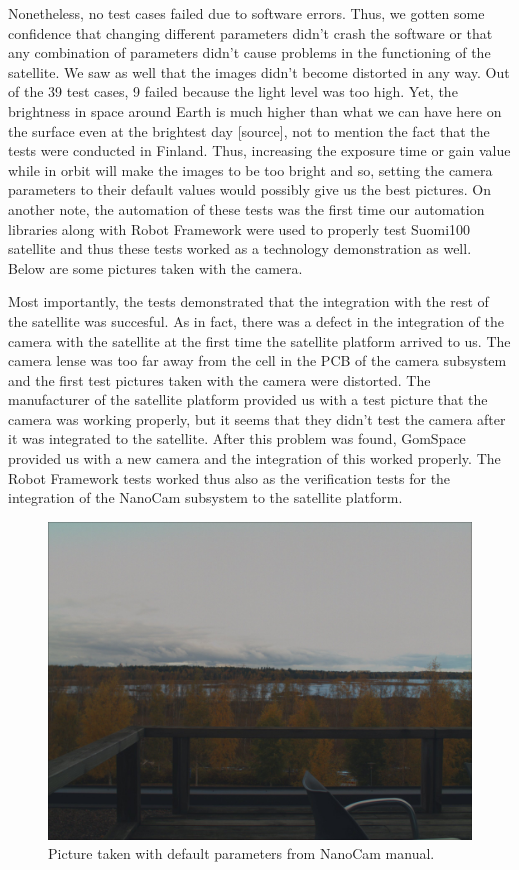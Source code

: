 \documentclass[english,12pt,a4paper,pdftex,elec,utf8]{aaltothesis}
\begin{document}
Nonetheless, no test cases failed due to software errors. Thus, we gotten some confidence that changing different parameters didn't crash the software or that any combination of parameters didn't cause problems in the functioning of the satellite. We saw as well that the images didn't become distorted in any way. Out of the 39 test cases, 9 failed because the light level was too high. Yet, the brightness in space around Earth is much higher than what we can have here on the surface even at the brightest day [source], not to mention the fact that the tests were conducted in Finland. Thus, increasing the exposure time or gain value while in orbit will make the images to be too bright and so, setting the camera parameters to their default values would possibly give us the best pictures. On another note, the automation of these tests was the first time our automation libraries along with Robot Framework were used to properly test Suomi100 satellite and thus these tests worked as a technology demonstration as well. Below are some pictures taken with the camera.\par
Most importantly, the tests demonstrated that the integration with the rest of the satellite was succesful. As in fact, there was a defect in the integration of the camera with the satellite at the first time the satellite platform arrived to us. The camera lense was too far away from the cell in the PCB of the camera subsystem and the first test pictures taken with the camera were distorted. The manufacturer of the satellite platform provided us with a test picture that the camera was working properly, but it seems that they didn't test the camera after it was integrated to the satellite. After this problem was found, GomSpace provided us with a new camera and the integration of this worked properly. The Robot Framework tests worked thus also as the verification tests for the integration of the NanoCam subsystem to the satellite platform.\par 
\begin{figure}[h!]
\includegraphics[scale=0.2]{def}
\caption{Picture taken with default parameters from NanoCam manual.}
\end{figure}
\end{document}
